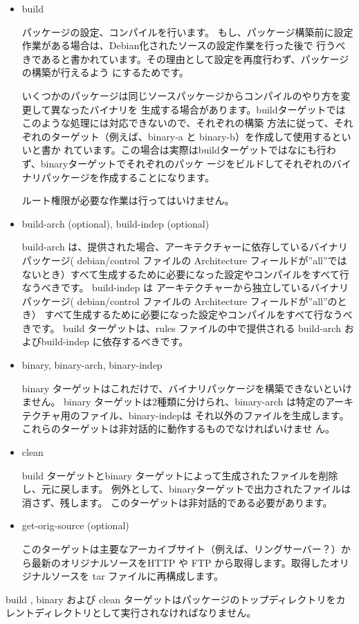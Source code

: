 \documentclass[mingoth,a4paper]{jsarticle}
\begin{document}
\begin{itemize}
	\item build

		パッケージの設定、コンパイルを行います。
		もし、パッケージ構築前に設定作業がある場合は、Debian化されたソースの設定作業を行った後で
		行うべきであると書かれています。その理由として設定を再度行わず、パッケージの構築が行えるよう
		にするためです。

		いくつかのパッケージは同じソースパッケージからコンパイルのやり方を変更して異なったバイナリを
		生成する場合があります。buildターゲットではこのような処理には対応できないので、それぞれの構築
		方法に従って、それぞれのターゲット（例えば、binary-a と binary-b）を作成して使用するといいと書か
		れています。この場合は実際はbuildターゲットではなにも行わず、binaryターゲットでそれぞれのパッケ
		ージをビルドしてそれぞれのバイナリパッケージを作成することになります。

		ルート権限が必要な作業は行ってはいけません。
		
	\item build-arch (optional), build-indep (optional)

		build-arch は、提供された場合、アーキテクチャーに依存しているバイナリパッケージ( debian/control ファイルの Architecture 
		フィールドが''all''ではないとき）すべて生成するために必要になった設定やコンパイルをすべて行なうべきです。
		build-indep は アーキテクチャーから独立しているバイナリパッケージ( debian/control ファイルの Architecture フィールドが''all''のとき）
		すべて生成するために必要になった設定やコンパイルをすべて行なうべきです。
		build ターゲットは、rules ファイルの中で提供される build-arch およびbuild-indep に依存するべきです。
	\item binary, binary-arch, binary-indep

		binary ターゲットはこれだけで、バイナリパッケージを構築できないといけません。
		binary ターゲットは2種類に分けられ、binary-arch は特定のアーキテクチャ用のファイル、binary-indepは
		それ以外のファイルを生成します。これらのターゲットは非対話的に動作するものでなければいけませ
		ん。
	\item clean

		build ターゲットとbinary ターゲットによって生成されたファイルを削除し、元に戻します。
		例外として、binaryターゲットで出力されたファイルは消さず、残します。
		このターゲットは非対話的である必要があります。


	\item get-orig-source (optional)

		このターゲットは主要なアーカイブサイト（例えば、リングサーバー？）から最新のオリジナルソースをHTTP や FTP
		から取得します。取得したオリジナルソースを tar ファイルに再構成します。
		

\end{itemize}
 build , binary および clean ターゲットはパッケージのトップディレクトリをカレントディレクトリとして実行されなければなりません。
 
\end{document}
